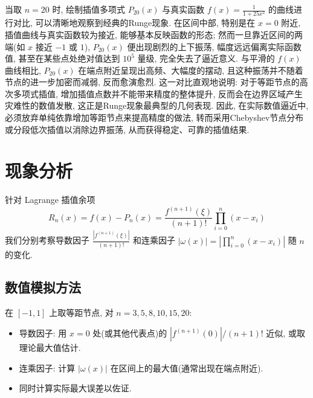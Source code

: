 \documentclass[12pt,a4paper]{ctexart}
\begin{document}
当取 $n=20$ 时, 绘制插值多项式 $P_{20}(x)$ 与真实函数 $f(x)=\frac{1}{1+25x^2}$ 的曲线进行对比, 可以清晰地观察到经典的Runge现象. 在区间中部, 特别是在 $x=0$ 附近, 插值曲线与真实函数较为接近, 能够基本反映函数的形态; 然而一旦靠近区间的两端(如 $x$ 接近 $-1$ 或 $1$), $P_{20}(x)$ 便出现剧烈的上下振荡, 幅度远远偏离实际函数值, 甚至在某些点处绝对值达到 $10^5$ 量级, 完全失去了逼近意义. 与平滑的 $f(x)$ 曲线相比, $P_{20}(x)$ 在端点附近呈现出高频、大幅度的摆动, 且这种振荡并不随着节点的进一步加密而减弱, 反而愈演愈烈. 这一对比直观地说明: 对于等距节点的高次多项式插值, 增加插值点数并不能带来精度的整体提升, 反而会在边界区域产生灾难性的数值发散, 这正是Runge现象最典型的几何表现. 因此, 在实际数值逼近中, 必须放弃单纯依靠增加等距节点来提高精度的做法, 转而采用Chebyshev节点分布或分段低次插值以消除边界振荡, 从而获得稳定、可靠的插值结果. 
\section{现象分析}
针对 Lagrange 插值余项
\[
R_n(x)=f(x)-P_n(x)=\frac{f^{(n+1)}(\xi)}{(n+1)!}\prod_{i=0}^{n}(x-x_i)
\]
我们分别考察导数因子 $\frac{|f^{(n+1)}(\xi)|}{(n+1)!}$ 和连乘因子 $|\omega(x)|=|\prod_{i=0}^{n}(x-x_i)|$ 随 $n$ 的变化. 

\subsection*{数值模拟方法}
在 $[-1,1]$ 上取等距节点, 对 $n=3,5,8,10,15,20$: 
\begin{itemize}
    \item 导数因子: 用 $x=0$ 处(或其他代表点)的 $|f^{(n+1)}(0)|/(n+1)!$ 近似, 或取理论最大值估计. 
    \item 连乘因子: 计算 $|\omega(x)|$ 在区间上的最大值(通常出现在端点附近). 
    \item 同时计算实际最大误差以佐证. 
\end{itemize}
\end{document}
